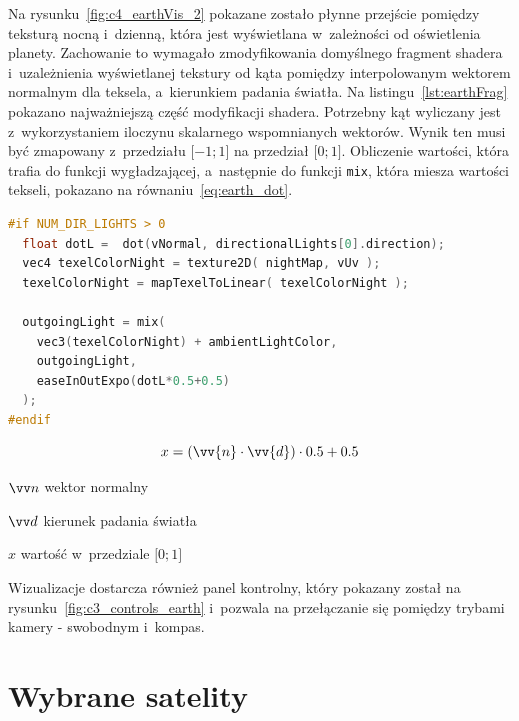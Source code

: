 Na rysunku~\ref{fig:c4_earthVis_2} pokazane zostało płynne przejście pomiędzy teksturą nocną i~dzienną, która jest wyświetlana w~zależności od oświetlenia planety. Zachowanie to wymagało zmodyfikowania domyślnego fragment shadera i~uzależnienia wyświetlanej tekstury od kąta pomiędzy interpolowanym wektorem normalnym dla teksela, a~kierunkiem padania światła. Na listingu~\ref{lst:earthFrag} pokazano najważniejszą część modyfikacji shadera. Potrzebny kąt wyliczany jest z~wykorzystaniem iloczynu skalarnego wspomnianych wektorów. Wynik ten musi być zmapowany z~przedziału $\lbrack-1; 1\rbrack$ na przedział $\lbrack0; 1\rbrack$. Obliczenie wartości, która trafia do funkcji wygładzającej, a~następnie do funkcji \texttt{mix}, która miesza wartości tekseli, pokazano na równaniu~\ref{eq:earth_dot}.

\begin{lstlisting}[float=h, language=C++, label={lst:earthFrag}, caption={
  Modyfikacja fragment shadera materiału \texttt{MeshPhongMaterial}}
]
#if NUM_DIR_LIGHTS > 0
  float dotL =  dot(vNormal, directionalLights[0].direction);
  vec4 texelColorNight = texture2D( nightMap, vUv );
  texelColorNight = mapTexelToLinear( texelColorNight );

  outgoingLight = mix(
    vec3(texelColorNight) + ambientLightColor,
    outgoingLight,
    easeInOutExpo(dotL*0.5+0.5)
  );
#endif
\end{lstlisting}
\begin{equation}
  \label{eq:earth_dot}
  x = (\vv{n} \cdot \vv{d}) \cdot 0.5 + 0.5
\end{equation}
\begin{eqexpl}[25mm]
\item {$\vv n$} wektor normalny
\item {$\vv d$} kierunek padania światła
\item {$x$} wartość w~przedziale $\lbrack0; 1\rbrack$
\end{eqexpl}
\vspace{\baselineskip}

Wizualizacje dostarcza również panel kontrolny, który pokazany został na rysunku~\ref{fig:c3_controls_earth} i~pozwala na przełączanie się pomiędzy trybami kamery - swobodnym i~kompas.

\section{Wybrane satelity}

